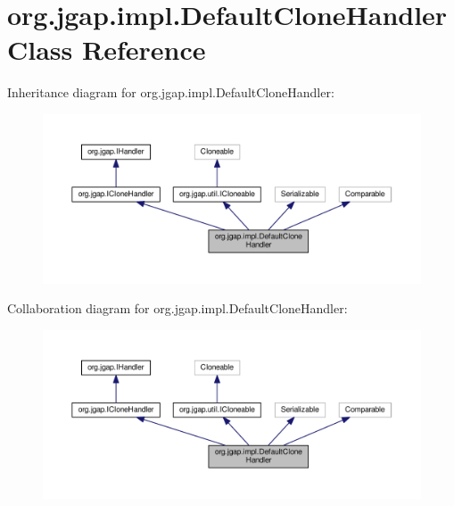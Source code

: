\hypertarget{classorg_1_1jgap_1_1impl_1_1_default_clone_handler}{\section{org.\-jgap.\-impl.\-Default\-Clone\-Handler Class Reference}
\label{classorg_1_1jgap_1_1impl_1_1_default_clone_handler}
}


Inheritance diagram for org.\-jgap.\-impl.\-Default\-Clone\-Handler\-:
\nopagebreak
\begin{figure}[H]
\begin{center}
\leavevmode
\includegraphics[width=350pt]{classorg_1_1jgap_1_1impl_1_1_default_clone_handler__inherit__graph}
\end{center}
\end{figure}


Collaboration diagram for org.\-jgap.\-impl.\-Default\-Clone\-Handler\-:
\nopagebreak
\begin{figure}[H]
\begin{center}
\leavevmode
\includegraphics[width=350pt]{classorg_1_1jgap_1_1impl_1_1_default_clone_handler__coll__graph}
\end{center}
\end{figure}

